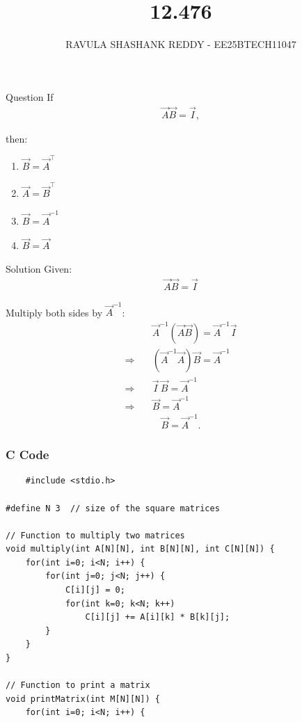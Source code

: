 \documentclass{beamer}
\title %
{12.476}
\author %
{RAVULA SHASHANK REDDY - EE25BTECH11047}
\begin{document}
	
	
	\frame{\titlepage}
	\begin{frame}{Question}
    If
\begin{align*}
\vec{A} \vec{B} = \vec{I},
\end{align*}

then:

\begin{enumerate}[label=\alph*)]
    \item $\vec{B} = \vec{A}^{\top}$
    \item $\vec{A} = \vec{B}^{\top}$
    \item $\vec{B} = \vec{A}^{-1}$
    \item $\vec{B} = \vec{A}$
\end{enumerate}

\end{frame}
\begin{frame}{Solution}
    Given:
\begin{align}
 \vec{A} \vec{B} = \vec{I} 
 \end{align}
 
Multiply both sides by  $\vec{A}^{-1}$: 
\begin{align}
&\vec{A}^{-1} (\vec{A} \vec{B}) = \vec{A}^{-1} \vec{I} \\
\Rightarrow \quad & (\vec{A}^{-1} \vec{A}) \vec{B} = \vec{A}^{-1} \\
\Rightarrow \quad & \vec{I} \, \vec{B} = \vec{A}^{-1} \\
\Rightarrow \quad & \vec{B} = \vec{A}^{-1}
\end{align}
\begin{align}
 \boxed{\vec{B} = \vec{A}^{-1}}.
\end{align}
\end{frame}
\begin{frame}[fragile]
\frametitle{C Code}
\begin{lstlisting}
    #include <stdio.h>

#define N 3  // size of the square matrices

// Function to multiply two matrices
void multiply(int A[N][N], int B[N][N], int C[N][N]) {
    for(int i=0; i<N; i++) {
        for(int j=0; j<N; j++) {
            C[i][j] = 0;
            for(int k=0; k<N; k++)
                C[i][j] += A[i][k] * B[k][j];
        }
    }
}

// Function to print a matrix
void printMatrix(int M[N][N]) {
    for(int i=0; i<N; i++) {
    \end{lstlisting}
    \end{frame}
\end{document}
